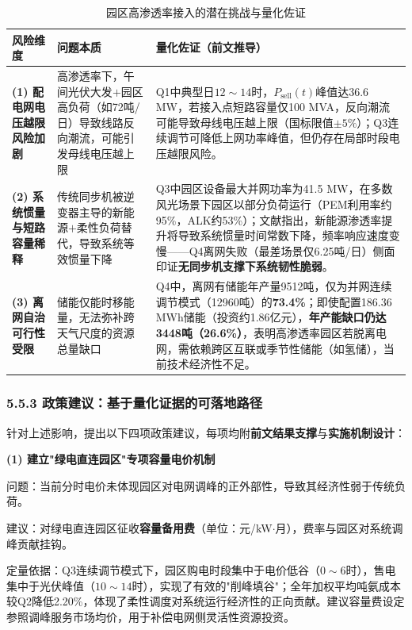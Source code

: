 \documentclass[zihao=-4,a4paper]{ctexart} %
\begin{document}
	\begin{table}[ht]
		\centering
		\small
		\caption{园区高渗透率接入的潜在挑战与量化佐证}
		\label{tab:q5_negative}
		\begin{tabular}{p{28mm}p{48mm}p{60mm}}
			\toprule
			风险维度 & 问题本质 & 量化佐证（前文推导） \\
			\midrule
			\textbf{(1) 配电网电压越限风险加剧} & 高渗透率下，午间光伏大发$+$园区高负荷（如72吨/日）导致线路反向潮流，可能引发母线电压越上限 & Q1中典型日$12\sim14$时，$P_{\text{sell}}(t)$峰值达36.6 MW，若接入点短路容量仅100 MVA，反向潮流可能导致母线电压越上限（国标限值$\pm5\%$）；Q3连续调节可降低上网功率峰值，但仍存在局部时段电压越限风险。 \\
			\midrule
			\textbf{(2) 系统惯量与短路容量稀释} & 传统同步机被逆变器主导的新能源$+$柔性负荷替代，导致系统等效惯量下降 & Q3中园区设备最大并网功率为41.5 MW，在多数风光场景下园区以部分负荷运行（PEM利用率约95\%，ALK约53\%）；文献\cite{2}指出，新能源渗透率提升将导致系统惯量时间常数下降，频率响应速度变慢——Q4离网失败（最差场景仅6.25吨/日）侧面印证\textbf{无同步机支撑下系统韧性脆弱}。 \\
			\midrule
			\textbf{(3) 离网自治可行性受限} & 储能仅能时移能量，无法弥补跨天气尺度的资源总量缺口 & Q4中，离网有储能年产量9512吨，仅为并网连续调节模式（12960吨）的\textbf{73.4\%}；即使配置186.36 MWh储能（投资约1.86亿元），\textbf{年产能缺口仍达3448吨（26.6\%）}，表明高渗透率园区若脱离电网，需依赖跨区互联或季节性储能（如氢储），当前技术经济性不足。 \\
			\bottomrule
		\end{tabular}
	\end{table}
	
	\subsubsection*{5.5.3 政策建议：基于量化证据的可落地路径}
	
	针对上述影响，提出以下四项政策建议，每项均附\textbf{前文结果支撑}与\textbf{实施机制设计}：
	
	\textbf{(1) 建立"绿电直连园区"专项容量电价机制}
	
	\par\quad 问题：当前分时电价未体现园区对电网调峰的正外部性，导致其经济性弱于传统负荷。
	
	\par\quad 建议：对绿电直连园区征收\textbf{容量备用费}（单位：元/kW$\cdot$月），费率与园区对系统调峰贡献挂钩。
	
	\par\quad 定量依据：Q3连续调节模式下，园区购电时段集中于电价低谷（$0\sim6$时），售电集中于光伏峰值（$10\sim14$时），实现了有效的"削峰填谷"；全年加权平均吨氨成本较Q2降低2.20\%，体现了柔性调度对系统运行经济性的正向贡献。建议容量费设定参照调峰服务市场均价，用于补偿电网侧灵活性资源投资。
	
\end{document}
